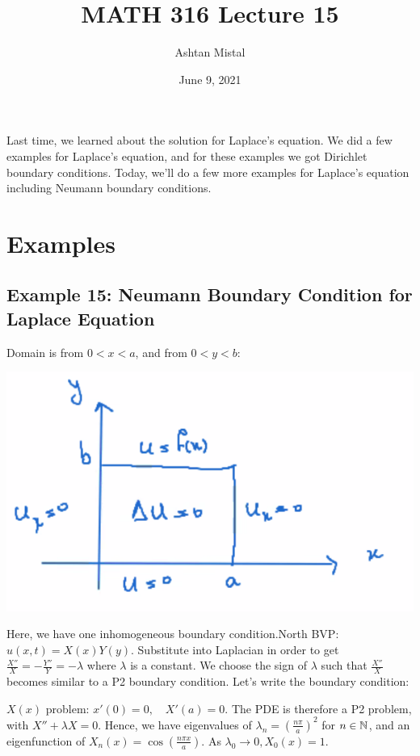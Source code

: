 \documentclass{article}
\title{MATH 316 Lecture 15}
\author{Ashtan Mistal}
\date{June 9, 2021}
\begin{document}
\ifstandalone
\maketitle
\fi

\graphicspath{{./Lecture15/}}

Last time, we learned about the solution for Laplace's equation. We did a few examples for Laplace's equation, and for these examples we got Dirichlet boundary conditions. Today, we'll do a few more examples for Laplace's equation including Neumann boundary conditions. 

\section{Examples}

\subsection{Example 15: Neumann Boundary Condition for Laplace Equation}

Domain is from $0 < x < a$, and from $0 < y < b$:

\begin{center}
    \includegraphics[width = 0.6 \textwidth]{1.png}
\end{center}

Here, we have one inhomogeneous boundary condition.North BVP: $u(x,t) = X(x) Y(y)$. Substitute into Laplacian in order to get $\frac{X''}{X} = - \frac{Y''}{Y} = - \lambda$ where $\lambda$ is a constant. We choose the sign of $\lambda$ such that $\frac{X''}{X}$ becomes similar to a P2 boundary condition. Let's write the boundary condition: 

$X(x)$ problem: $x'(0) = 0, \quad X'(a) = 0$. The PDE is therefore a P2 problem, with $X'' + \lambda X = 0$. Hence, we have eigenvalues of $\lambda_n = \left( \frac{n \pi}{a} \right)^2$ for $n \in \mathbb{N}$, and an eigenfunction of $X_n (x) = \cos \left( \frac{n \pi x}{a} \right)$. As $\lambda_0 \to 0, X_0(x) = 1$. 
\end{document}
